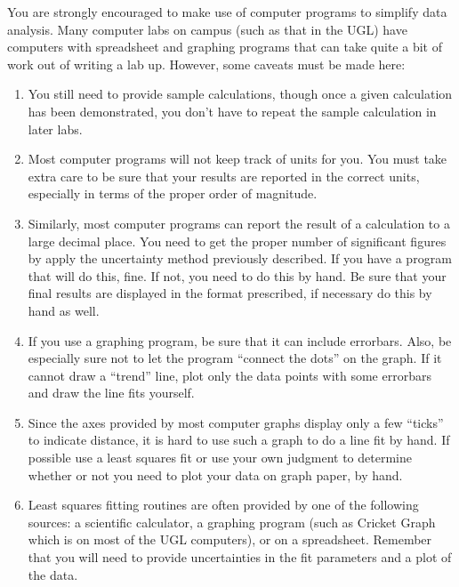 You are strongly encouraged to make use of computer programs to simplify data
analysis.  Many computer labs on campus (such as that in the UGL) have 
computers with spreadsheet and graphing programs that can take quite a bit of 
work out of writing a lab up. However, some caveats must be made here:
\begin{enumerate}
\item You still need to provide sample calculations, though once a given 
calculation has been demonstrated, you don't have to repeat the sample 
calculation in later labs.   

\item Most computer programs will not keep track of  units for you. You must 
take extra care to be sure that your results are reported in the correct units,
especially in terms of the proper order of magnitude.

\item Similarly, most computer programs can report the result of a calculation
to a large decimal place. You need to get the proper number of significant
figures by apply the uncertainty method previously described. If you have a
program that will do this, fine. If not, you need to do this by hand. Be sure
that your final results are displayed in the format prescribed, if necessary
do this by hand as well.

\item If you use a graphing program, be sure that it can include errorbars. 
Also, be especially sure not to let the program 
``connect the dots'' on the graph. If it cannot draw a ``trend'' line, 
plot only the data points with some errorbars and draw the line fits yourself.

\item Since the axes provided by most computer graphs display only a few 
``ticks'' to indicate distance, it is hard to use such a graph to do a line 
fit by hand.  If possible use a least squares fit or use your own judgment to 
determine whether or not you need to plot your data on graph paper, by hand.
\item Least squares fitting routines are often provided by one of the following
sources: a scientific calculator, a graphing program (such as Cricket Graph 
which is on most of the UGL computers), or on a spreadsheet.  Remember that
you will need to provide uncertainties in the fit parameters and a plot
of the data.     
\end{enumerate}
